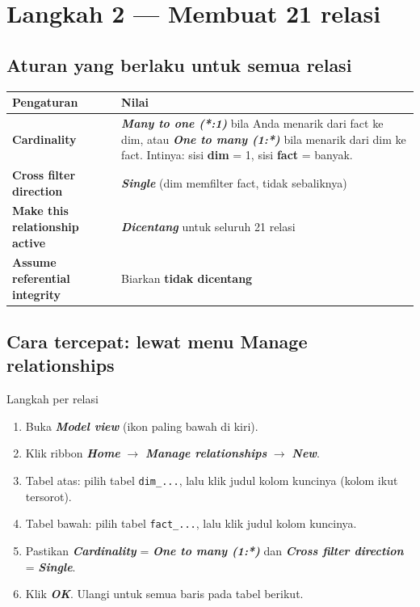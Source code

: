 \documentclass[11pt,a4paper]{article}
\newcommand{\file}[1]{\texttt{\small #1}}
\newcommand{\ui}[1]{\textbf{\textit{#1}}}
\begin{document}
\section{Langkah 2 --- Membuat 21 relasi}\label{sec:relasi}

\subsection{Aturan yang berlaku untuk semua relasi}

\begin{center}
\begin{tabularx}{\linewidth}{>{\bfseries}p{4.2cm}X}
\toprule
Pengaturan & Nilai \\
\midrule
Cardinality & \ui{Many to one (*:1)} bila Anda menarik dari fact ke dim, atau \ui{One to many (1:*)} bila menarik dari dim ke fact. Intinya: sisi \textbf{dim} = 1, sisi \textbf{fact} = banyak. \\
Cross filter direction & \ui{Single} (dim memfilter fact, tidak sebaliknya) \\
Make this relationship active & \ui{Dicentang} untuk seluruh 21 relasi \\
Assume referential integrity & Biarkan \textbf{tidak dicentang} \\
\bottomrule
\end{tabularx}
\end{center}

\subsection{Cara tercepat: lewat menu Manage relationships}

\begin{stepbox}{Langkah per relasi}
\begin{enumerate}
\item Buka \ui{Model view} (ikon paling bawah di kiri).
\item Klik ribbon \ui{Home} $\rightarrow$ \ui{Manage relationships} $\rightarrow$ \ui{New}.
\item Tabel atas: pilih tabel \file{dim\_...}, lalu klik judul kolom kuncinya (kolom ikut tersorot).
\item Tabel bawah: pilih tabel \file{fact\_...}, lalu klik judul kolom kuncinya.
\item Pastikan \ui{Cardinality} = \ui{One to many (1:*)} dan \ui{Cross filter direction} = \ui{Single}.
\item Klik \ui{OK}. Ulangi untuk semua baris pada tabel berikut.
\end{enumerate}
\end{stepbox}
\end{document}
